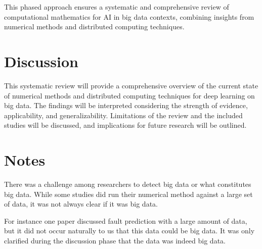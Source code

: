 \documentclass[a4paper,12pt]{article}
\begin{document}
This phased approach ensures a systematic and comprehensive review of computational mathematics for AI in big data contexts, combining insights from numerical methods and distributed computing techniques.

\section{Discussion}
This systematic review will provide a comprehensive overview of the current state of numerical methods and distributed computing techniques for deep learning on big data. The findings will be interpreted considering the strength of evidence, applicability, and generalizability. Limitations of the review and the included studies will be discussed, and implications for future research will be outlined.


\section{Notes}

There was a challenge among researchers to detect big data or what constitutes big data. While some studies did run their numerical method against a large set of data, it was not always clear if it was big data. 

For instance one paper discussed fault prediction with a large amount of data, but it did not occur naturally to us that this data could be big data. It was only clarified during the discussion phase that the data was indeed big data.



\end{document}
